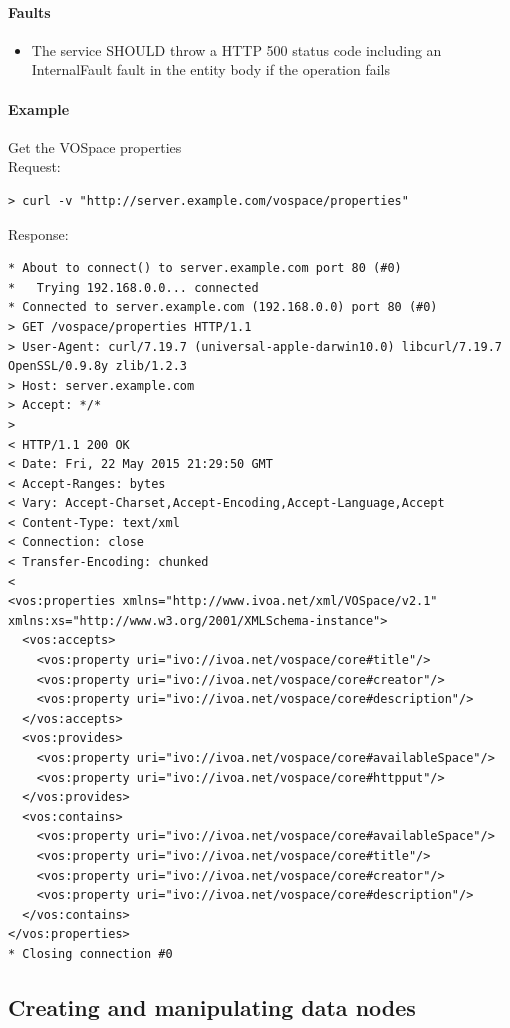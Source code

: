 \documentclass[11pt,a4paper]{ivoa}
\begin{document}
\paragraph{Faults}
\begin{itemize}
    \item The service SHOULD throw a HTTP 500 status code including an InternalFault fault in the entity body if the operation fails
\end{itemize}

\paragraph{Example}
Get the VOSpace properties
\\[5px]
\noindent
Request:
\begin{lstlisting}
> curl -v "http://server.example.com/vospace/properties"
\end{lstlisting}
Response:
\begin{lstlisting}
* About to connect() to server.example.com port 80 (#0)
*   Trying 192.168.0.0... connected
* Connected to server.example.com (192.168.0.0) port 80 (#0)
> GET /vospace/properties HTTP/1.1
> User-Agent: curl/7.19.7 (universal-apple-darwin10.0) libcurl/7.19.7 OpenSSL/0.9.8y zlib/1.2.3
> Host: server.example.com
> Accept: */*
>
< HTTP/1.1 200 OK
< Date: Fri, 22 May 2015 21:29:50 GMT
< Accept-Ranges: bytes
< Vary: Accept-Charset,Accept-Encoding,Accept-Language,Accept
< Content-Type: text/xml
< Connection: close
< Transfer-Encoding: chunked
<
<vos:properties xmlns="http://www.ivoa.net/xml/VOSpace/v2.1" xmlns:xs="http://www.w3.org/2001/XMLSchema-instance">
  <vos:accepts>
    <vos:property uri="ivo://ivoa.net/vospace/core#title"/>
    <vos:property uri="ivo://ivoa.net/vospace/core#creator"/>
    <vos:property uri="ivo://ivoa.net/vospace/core#description"/>
  </vos:accepts>
  <vos:provides>
    <vos:property uri="ivo://ivoa.net/vospace/core#availableSpace"/>
    <vos:property uri="ivo://ivoa.net/vospace/core#httpput"/>
  </vos:provides>
  <vos:contains>
    <vos:property uri="ivo://ivoa.net/vospace/core#availableSpace"/>
    <vos:property uri="ivo://ivoa.net/vospace/core#title"/>
    <vos:property uri="ivo://ivoa.net/vospace/core#creator"/>
    <vos:property uri="ivo://ivoa.net/vospace/core#description"/>
  </vos:contains>
</vos:properties>
* Closing connection #0
\end{lstlisting}

\subsection{Creating and manipulating data nodes}
\label{subsec:creating and manipulating data nodes}
\end{document}
